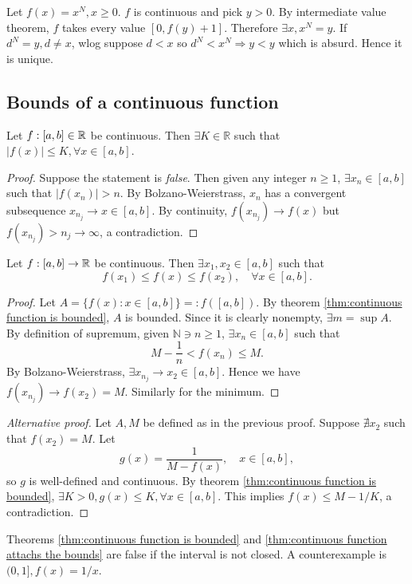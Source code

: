 \begin{example}
    Let $ f(x)=x^N, x\ge 0 $. $f$ is continuous and pick $y>0$. By intermediate value theorem, $f$ takes every value $ [0,f(y)+1] $. Therefore $ \exists x, x^N=y $. If $ d^N=y,d\neq x $, wlog suppose $d<x$ so $ d^N<x^N \Rightarrow y<y $ which is absurd. Hence it is unique. 
\end{example}

\subsection{Bounds of a continuous function}
\begin{theorem}\label{thm:continuous function is bounded}
    Let $f:[a,b]\in {\mathbb{R}}$ be continuous. Then $ \exists K\in \mathbb{R}  $ such that $ |f(x)|\le K, \forall x\in [a,b] $.
\end{theorem}
\begin{proof}
    Suppose the statement is \textit{false}. Then given any integer $ n\ge 1 $, $ \exists x_n\in[a,b] $ such that $ |f(x_n)|> n $. By Bolzano-Weierstrass, $x_n$ has a convergent subsequence $ x_{n_j}\to x\in [a,b] $. By continuity, $ f(x_{n_j})\to f(x) $ but $f(x_{n_j})>n_j\to \infty$, a contradiction.
\end{proof}

\begin{theorem}\label{thm:continuous function attachs the bounds}
    Let $ f:[a,b]\to {\mathbb{R}} $ be continuous. Then $ \exists x_1,x_2\in [a,b] $ such that 
    \[
        f(x_1)\le f(x)\le f(x_2),\quad \forall x\in [a,b].
    \]
\end{theorem}
\begin{proof}
    Let $ A = \{f(x):x\in [a,b]\}=: f([a,b]) $. By theorem \ref{thm:continuous function is bounded}, $A$ is bounded. Since it is clearly nonempty, $ \exists m = \sup A $. By definition of supremum, given $ \mathbb{N} \ni n\ge 1$, $ \exists x_n\in [a,b] $ such that 
    \[
        M-\frac{1}{n}<f(x_n)\le M.
    \]
    By Bolzano-Weierstrass, $ \exists x_{n_j}\to x_2\in [a,b] $. Hence we have $ f(x_{n_j})\to f(x_2) = M $. Similarly for the minimum.
\end{proof}

\begin{proof}[Alternative proof]
    Let $A,M$ be defined as in the previous proof. Suppose $\nexists x_2$ such that $ f(x_2)=M $. Let 
    \[
        g(x) = \frac{1}{M-f(x)},\quad x\in [a,b],
    \]
    so $g$ is well-defined and continuous. By theorem \ref{thm:continuous function is bounded}, $ \exists K>0, g(x)\le K,\forall x\in [a,b] $. This implies $ f(x)\le M-1/K $, a contradiction.
\end{proof}
\begin{note}
    Theorems \ref{thm:continuous function is bounded} and \ref{thm:continuous function attachs the bounds} are false if the interval is not closed. A counterexample is $ (0,1], f(x)=1/x $.
\end{note}

